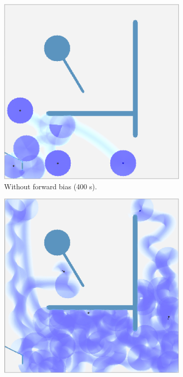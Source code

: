 %
\begin{figure}[H]
  \centering
  \begin{subfigure}[b]{0.45\textwidth}
    \centering
        \includegraphics[width=\textwidth]{./figures/screenshots/without-forward.png}
    \caption{Without forward bias (400 s).}
    \label{fig:search-gradient-no-forward}
  \end{subfigure}
  \begin{subfigure}[b]{0.45\textwidth}
    \centering
    \includegraphics[width=\textwidth]{./figures/screenshots/with-forward.jpeg}

\end{subfigure}
\end{figure}
